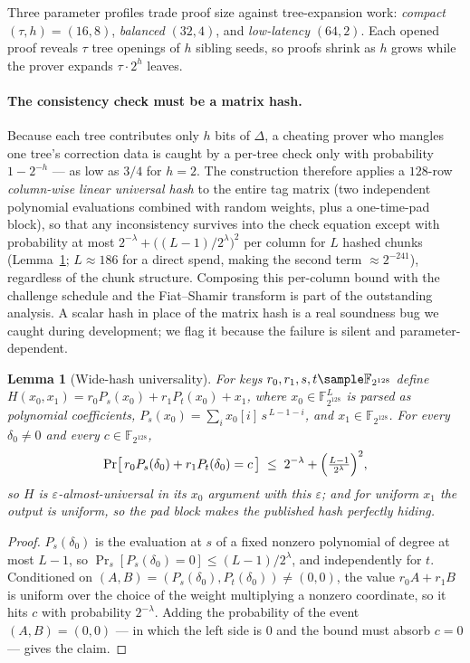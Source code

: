 \documentclass[11pt]{article}
\newtheorem{lemma}{Lemma}
\newcommand{\F}{\mathbb{F}}
\newcommand{\Ftag}{\F_{2^{128}}}
\begin{document}
Three parameter profiles trade proof size against tree-expansion work:
\emph{compact} $(\tau,h) = (16,8)$, \emph{balanced} $(32,4)$, and
\emph{low-latency} $(64,2)$. Each opened proof reveals $\tau$ tree openings
of $h$ sibling seeds, so proofs shrink as $h$ grows while the prover expands
$\tau \cdot 2^h$ leaves.

\paragraph{The consistency check must be a matrix hash.}
Because each tree contributes only $h$ bits of $\Delta$, a cheating prover
who mangles one tree's correction data is caught by a per-tree check only
with probability $1 - 2^{-h}$ --- as low as $3/4$ for $h=2$. The
construction therefore applies a $128$-row \emph{column-wise linear
universal hash} to the entire tag matrix (two independent polynomial
evaluations combined with random weights, plus a one-time-pad block), so
that any inconsistency survives into the check equation except with
probability at most $2^{-\lambda} + \bigl((L{-}1)/2^{\lambda}\bigr)^{2}$
per column for $L$ hashed chunks (Lemma~\ref{lem:hash}; $L \approx 186$
for a direct spend, making the second term $\approx 2^{-241}$),
regardless of the chunk structure. Composing this per-column bound with
the challenge schedule and the Fiat--Shamir transform is part of the
outstanding analysis. A scalar hash in place of the matrix hash is a real
soundness bug we caught during development; we flag it because the
failure is silent and parameter-dependent.

\begin{lemma}[Wide-hash universality]
\label{lem:hash}
For keys $r_0, r_1, s, t \sample \Ftag$ define
$H(x_0, x_1) = r_0 P_s(x_0) + r_1 P_t(x_0) + x_1$, where
$x_0 \in \Ftag^{L}$ is parsed as polynomial coefficients,
$P_s(x_0) = \sum_{i} x_0[i]\, s^{\,L-1-i}$, and $x_1 \in \Ftag$. For
every $\delta_0 \ne 0$ and every $c \in \Ftag$,
\[
\Pr\bigl[\, r_0 P_s(\delta_0) + r_1 P_t(\delta_0) = c \,\bigr]
\;\le\; 2^{-\lambda} + \Bigl(\tfrac{L-1}{2^{\lambda}}\Bigr)^{2},
\]
so $H$ is $\varepsilon$-almost-universal in its $x_0$ argument with this
$\varepsilon$; and for uniform $x_1$ the output is uniform, so the pad
block makes the published hash perfectly hiding.
\end{lemma}

\begin{proof}
$P_s(\delta_0)$ is the evaluation at $s$ of a fixed nonzero polynomial of
degree at most $L-1$, so $\Pr_s[P_s(\delta_0) = 0] \le (L-1)/2^{\lambda}$,
and independently for $t$. Conditioned on
$(A, B) = (P_s(\delta_0), P_t(\delta_0)) \ne (0,0)$, the value
$r_0 A + r_1 B$ is uniform over the choice of the weight multiplying a
nonzero coordinate, so it hits $c$ with probability $2^{-\lambda}$.
Adding the probability of the event $(A,B) = (0,0)$ --- in which the
left side is $0$ and the bound must absorb $c = 0$ --- gives the claim.
\end{proof}
\end{document}
